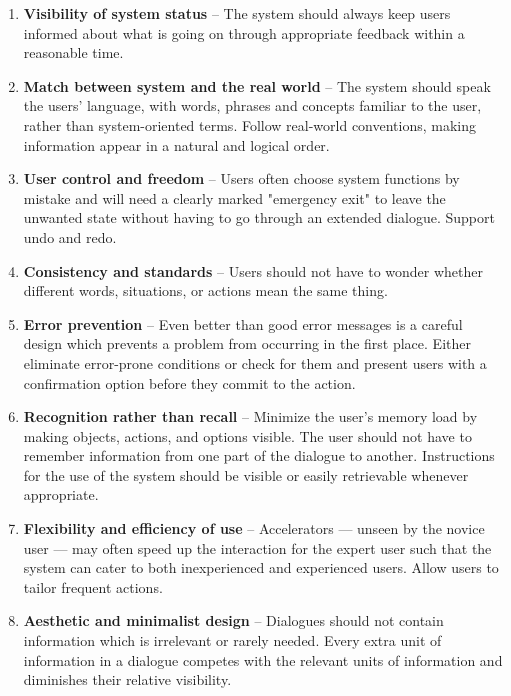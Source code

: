 \begin{enumerate}
    \item \textbf{Visibility of system status} -- The system should always keep users informed about what is going on through appropriate feedback within a reasonable time. 
    
    \item \textbf{Match between system and the real world} -- The system should speak the users' language, with words, phrases and concepts familiar to the user, rather than system-oriented terms. Follow real-world conventions, making information appear in a natural and logical order.
    
    \item \textbf{User control and freedom} -- Users often choose system functions by mistake and will need a clearly marked "emergency exit" to leave the unwanted state without having to go through an extended dialogue. Support undo and redo.
    
    \item \textbf{Consistency and standards} -- Users should not have to wonder whether different words, situations, or actions mean the same thing.
    
    \item \textbf{Error prevention} -- Even better than good error messages is a careful design which prevents a problem from occurring in the first place. Either eliminate error-prone conditions or check for them and present users with a confirmation option before they commit to the action.
    
    \item \textbf{Recognition rather than recall} -- Minimize the user's memory load by making objects, actions, and options visible. The user should not have to remember information from one part of the dialogue to another. Instructions for the use of the system should be visible or easily retrievable whenever appropriate.
    
    \item \textbf{Flexibility and efficiency of use} -- Accelerators — unseen by the novice user — may often speed up the interaction for the expert user such that the system can cater to both inexperienced and experienced users. Allow users to tailor frequent actions.
    
    \item \textbf{Aesthetic and minimalist design} -- Dialogues should not contain information which is irrelevant or rarely needed. Every extra unit of information in a dialogue competes with the relevant units of information and diminishes their relative visibility.
    

\end{enumerate}
